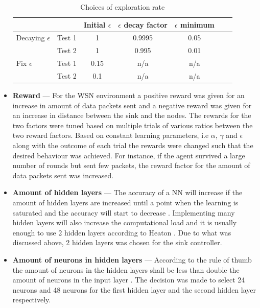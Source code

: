 \begin{itemize}
    \begin{table}[h!]
        \centering
        \caption{Choices of exploration rate}
        \label{tb:epsilonchoice}
        \begin{tabular}{llcccll}
            \toprule
                     &        &\textbf{Initial $\epsilon$} & \textbf{$\epsilon$ decay factor} & \textbf{$\epsilon$ minimum}\\
            \midrule
         Decaying $\epsilon$  & Test 1 & 1 & 0.9995 & 0.05\\
                     & Test 2 & 1 & 0.995 &  0.01\\ \midrule
         Fix $\epsilon$       & Test 1 & 0.15 & n/a &  n/a\\ 
                     & Test 2 & 0.1 & n/a &  n/a\\
            \bottomrule
        \end{tabular}
    \end{table}

    
    \item \textbf{Reward} --- For the WSN environment a positive reward was given for an increase in amount of data packets sent and a negative reward was given for an increase in distance between the sink and the nodes. The rewards for the two factors were tuned based on multiple trials of various ratios between the two reward factors. Based on constant learning parameters, i.e $\alpha$, $\gamma$ and $\epsilon$ along with the outcome of each trial the rewards were changed such that the desired behaviour was achieved. For instance, if the agent survived a large number of rounds but sent few packets, the reward factor for the amount of data packets sent was increased.
    
    \item \textbf{Amount of hidden layers} --- The accuracy of a NN will increase if the amount of hidden layers are increased until a point when the learning is saturated and the accuracy will start to decrease \cite{he2016deep}. Implementing many hidden layers will also increase the computational load and it is usually enough to use 2 hidden layers according to Heaton \cite{heaton2015artificial}. Due to what was discussed above, 2 hidden layers was chosen for the sink controller. 
    
    \item \textbf{Amount of neurons in hidden layers} --- According to the rule of thumb the amount of neurons in the hidden layers shall be less than double the amount of neurons in the input layer \cite{heaton2015artificial}. The decision was made to select 24 neurons and 48 neurons for the first hidden layer and the second hidden layer respectively.     
\end{itemize}

